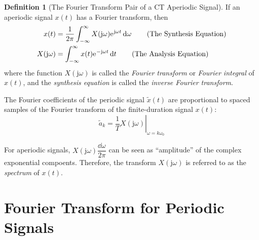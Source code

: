 \documentclass[10pt,UTF8]{article}
\newenvironment{definition box}
{\begin{tcolorbox}[colback=blue!5!white,colframe=blue!75!black,parbox=false,before upper=\par,before lower=\par]}
{\end{tcolorbox}}
\newenvironment{theorem box}
{\begin{tcolorbox}[colback=yellow!5!white,colframe=yellow!75!black,parbox=false,before upper=\par,before lower=\par]}
{\end{tcolorbox}}
\theoremstyle{definition}
\newtheorem{definition inner}{Definition}[section]
\newenvironment{definition}[1][]
{\begin{definition box}\begin{definition inner}[#1]\hfill\par}
{\end{definition inner}\end{definition box}}
\theoremstyle{plain}
\newtheorem{theorem inner}{Theorem}[section]
\theoremstyle{definition}
\newtheorem*{proof inner}{\textit{Proof}}
\theoremstyle{remark}
\newcommand{\ju}{\mathrm{j}}  %
\newcommand{\e}{\mathrm{e}{\mkern 1 mu}}
\begin{document}
\begin{definition}[The Fourier Transform Pair of a CT Aperiodic Signal]
If an aperiodic signal $x(t)$ has a Fourier transform, then
\begin{align*}
    x(t) &=
    \frac{1}{2\pi}\int_{-\infty}^{\infty}
    X(\ju\omega)\e^{\ju\omega t}\dd{\omega}
    \tag{The Synthesis Equation} \\
    X(\ju\omega) &=
    \int_{-\infty}^{\infty}x(t)\e^{-\ju\omega t}\dd{t}
    \tag{The Analysis Equation}
\end{align*}
where the function $X(\ju\omega)$ is called
the \emph{Fourier transform} or \emph{Fourier integral} of $x(t)$,
and the \emph{synthesis equation} is called the \emph{inverse Fourier transform}.
\end{definition}

\begin{theorem box}
The Fourier coefficients of the periodic signal $\tilde{x}(t)$
are proportional to spaced samples of
the Fourier transform of the finite-duration signal $x(t)$:
\begin{equation*}
    \tilde{a}_k =
    \left.\frac{1}{T}X(\ju\omega)\right|_{\omega=k\omega_0}
\end{equation*}
\end{theorem box}
For aperiodic signals, $X(\ju\omega)\dfrac{\dd{\omega}}{2\pi}$
can be seen as ``amplitude'' of the complex exponential compoents.
Therefore, the transform $X(\ju\omega)$ is referred to as
the \emph{spectrum} of $x(t)$.



\section{Fourier Transform for Periodic Signals}
\end{document}
